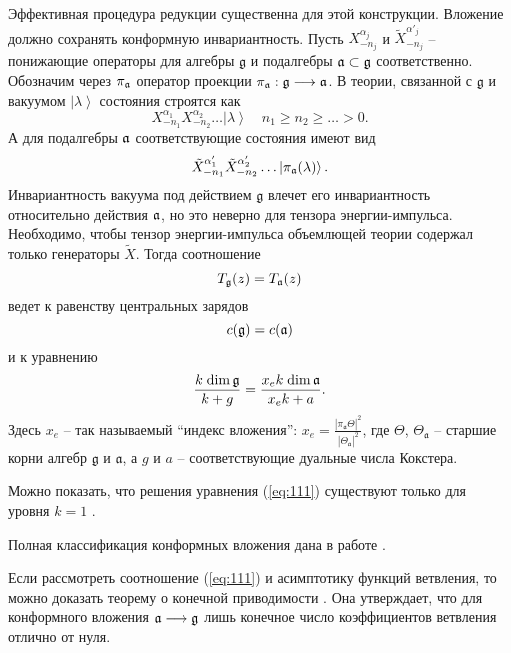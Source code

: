 Эффективная процедура редукции существенна для этой конструкции. Вложение должно сохранять конформную инвариантность. Пусть $X^{\alpha_j}_{-n_j}$ и $\tilde{X}^{\alpha'_j}_{-n_j}$ -- понижающие операторы для алгебры $\mathfrak{g}$ и подалгебры $\mathfrak{a}\subset\mathfrak{g}$ соответственно. Обозначим через $\pi_{\mathfrak{a}}$ оператор проекции $\pi_{\mathfrak{a}}:\mathfrak{g}\longrightarrow \mathfrak{a}$. В теории, связанной с $\mathfrak{g}$ и вакуумом $\left|\lambda\right>$ состояния строятся как
\begin{equation*}
  \label{eq:109}
  X^{\alpha_1}_{-n_1}X^{\alpha_2}_{-n_2}\dots\left|\lambda\right>\quad n_1\geq n_2\geq \dots>0.
\end{equation*}
А для подалгебры $\mathfrak{a}$ соответствующие состояния имеют вид
\begin{equation*}
  \label{eq:110}
  \tilde{X}^{\alpha'_1}_{-n_1}\tilde{X}^{\alpha'_2}_{-n_2}\dots\left|\pi_{\mathfrak{a}}(\lambda)\right>.
\end{equation*}
Инвариантность вакуума под действием $\mathfrak{g}$ влечет его инвариантность относительно действия $\mathfrak{a}$, но это неверно для тензора энергии-импульса. Необходимо, чтобы тензор энергии-импульса объемлющей теории содержал только генераторы $\tilde{X}$. Тогда соотношение
\begin{equation}
  \label{eq:2}
  T_{\mathfrak{g}}(z)=T_{\mathfrak{a}}(z)
\end{equation}
ведет к равенству центральных зарядов
\begin{equation*}
  \label{eq:33}
  c(\mathfrak{g})=c(\mathfrak{a})
\end{equation*}
и к уравнению
\begin{equation}
  \label{eq:111}
  \frac{k\;\mathrm{dim}\,\mathfrak{g}}{k+g}=\frac{x_e k\; \mathrm{dim}\,\mathfrak{a}}{x_ek+a}.
\end{equation}
Здесь $x_e$ -- так называемый ``индекс вложения'':
$x_e=\frac{\left|\pi_{\mathfrak{a}} \Theta\right|^2}{\left|\Theta_{\mathfrak{a}}\right|^2}$, где $\Theta$, $\Theta_{\mathfrak{a}}$ -- старшие корни алгебр
$\mathfrak{g}$ и $\mathfrak{a}$, а  $g$ и $a$ -- соответствующие дуальные числа Кокстера.

Можно показать, что решения уравнения (\ref{eq:111}) существуют только для уровня $k=1$ \cite{difrancesco1997cft}.

Полная классификация конформных вложения дана в работе \cite{schellekens1986conformal}.

Если рассмотреть соотношение (\ref{eq:111}) и асимптотику функций ветвления, то можно доказать теорему о конечной приводимости \cite{kac1988modular}. Она утверждает, что для конформного вложения  $\mathfrak{a}\longrightarrow\mathfrak{g}$ лишь конечное число коэффициентов ветвления отлично от нуля.

